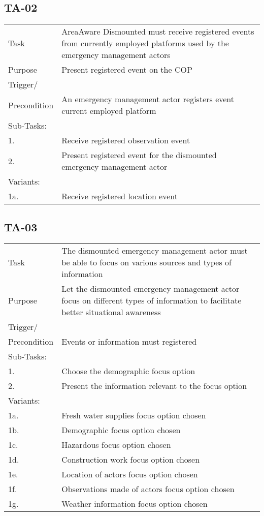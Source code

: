 \subsection{TA-02}
\begin{longtable}{| p{2.5cm}  | p{10cm} |  }
	\hline
	Task & AreaAware Dismounted must receive registered events from currently employed platforms used by the emergency management actors \\
	Purpose & Present registered event on the COP \\
	Trigger/ &  \\Precondition & An emergency management actor registers event current employed platform \\
	\hline
	Sub-Tasks: & \\
	1. & Receive registered observation event \\
	2. & Present registered event for the dismounted emergency management actor \\
	\hline
	Variants: & \\
	1a. & Receive registered location event \\
	\hline
\end{longtable}

\FloatBarrier
\newpage

\subsection{TA-03}
\begin{longtable}{| p{2.5cm}  | p{10cm} |  }
	\hline
	Task & The dismounted emergency management actor must be able to focus on various sources and types of information  \\
	Purpose & Let the dismounted emergency management actor focus on different types of information to facilitate better situational awareness \\
	Trigger/ &  \\ Precondition & Events or information must registered \\
	\hline
	Sub-Tasks: & \\
	1. & Choose the demographic focus option \\
	2. & Present the information relevant to the focus option \\
	\hline
	Variants: & \\
	1a. & Fresh water supplies focus option chosen \\
	1b. & Demographic focus option chosen \\
	1c. & Hazardous focus option chosen \\
	1d. & Construction work focus option chosen \\
	1e. & Location of actors focus option chosen \\
	1f. & Observations made of actors focus option chosen \\
	1g. & Weather information focus option chosen \\
	\hline
\end{longtable}



